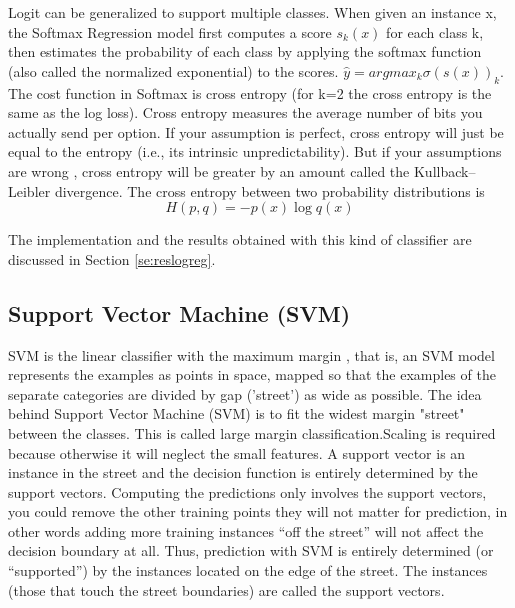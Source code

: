 \documentclass[11pt]{article}
\begin{document}
Logit can be generalized to support multiple classes. When given an instance x, the Softmax Regression model first computes a score $s_{k}(x)$ for each class k, then estimates the probability of each class by applying the softmax function (also called the normalized exponential) to the scores. $\hat{y}= argmax_{k} \sigma(s(x))_k$. The cost function in Softmax is cross entropy (for k=2 the cross entropy is the same as the log loss). Cross entropy measures the average number of bits you actually send per option. If your assumption is perfect, cross entropy will just be equal to the entropy (i.e., its intrinsic unpredictability). But if your assumptions are wrong , cross entropy will be greater by an amount called the Kullback–Leibler divergence. The cross entropy between two probability distributions is 
\begin{equation}
H(p,q)= -p(x)\log q(x)
\label{eq:softmax}
\end{equation}


The implementation and the results obtained with this kind of classifier are discussed in Section \ref{se:reslogreg}.

\subsection{Support Vector Machine (SVM)}
\label{sse:svm}
SVM is the linear classifier with the maximum margin \cite{vapnik2013nature}, that is, an SVM model represents the examples as points in space, mapped so that the examples of the separate categories are divided by gap ('street') as wide as possible.
The idea behind Support Vector Machine (SVM) is to fit the widest margin "street" between the classes. This is called large margin classification.Scaling is required because otherwise it will neglect the small features.
A support vector is an instance in the street and the decision function is entirely determined by the support vectors. Computing the predictions only involves the support vectors, you could remove the other training points they will not matter for prediction, in other words adding more training instances “off the street” will not affect the decision boundary at all. Thus, prediction with SVM is entirely determined (or “supported”) by the instances located on the edge of the street. The instances (those that touch the street boundaries) are called the support vectors. 
\end{document}
